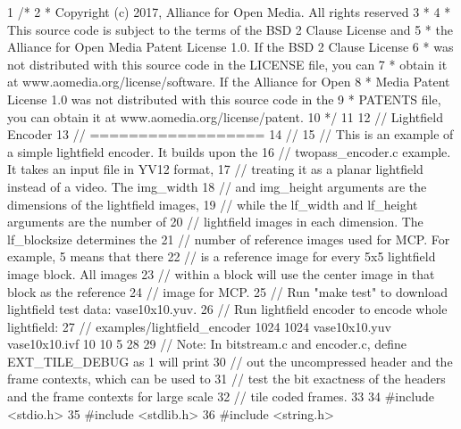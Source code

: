 \begin{DoxyCodeInclude}
1 \textcolor{comment}{/*}
2 \textcolor{comment}{ * Copyright (c) 2017, Alliance for Open Media. All rights reserved}
3 \textcolor{comment}{ *}
4 \textcolor{comment}{ * This source code is subject to the terms of the BSD 2 Clause License and}
5 \textcolor{comment}{ * the Alliance for Open Media Patent License 1.0. If the BSD 2 Clause License}
6 \textcolor{comment}{ * was not distributed with this source code in the LICENSE file, you can}
7 \textcolor{comment}{ * obtain it at www.aomedia.org/license/software. If the Alliance for Open}
8 \textcolor{comment}{ * Media Patent License 1.0 was not distributed with this source code in the}
9 \textcolor{comment}{ * PATENTS file, you can obtain it at www.aomedia.org/license/patent.}
10 \textcolor{comment}{ */}
11 
12 \textcolor{comment}{// Lightfield Encoder}
13 \textcolor{comment}{// ==================}
14 \textcolor{comment}{//}
15 \textcolor{comment}{// This is an example of a simple lightfield encoder.  It builds upon the}
16 \textcolor{comment}{// twopass\_encoder.c example. It takes an input file in YV12 format,}
17 \textcolor{comment}{// treating it as a planar lightfield instead of a video. The img\_width}
18 \textcolor{comment}{// and img\_height arguments are the dimensions of the lightfield images,}
19 \textcolor{comment}{// while the lf\_width and lf\_height arguments are the number of}
20 \textcolor{comment}{// lightfield images in each dimension. The lf\_blocksize determines the}
21 \textcolor{comment}{// number of reference images used for MCP. For example, 5 means that there}
22 \textcolor{comment}{// is a reference image for every 5x5 lightfield image block. All images}
23 \textcolor{comment}{// within a block will use the center image in that block as the reference}
24 \textcolor{comment}{// image for MCP.}
25 \textcolor{comment}{// Run "make test" to download lightfield test data: vase10x10.yuv.}
26 \textcolor{comment}{// Run lightfield encoder to encode whole lightfield:}
27 \textcolor{comment}{// examples/lightfield\_encoder 1024 1024 vase10x10.yuv vase10x10.ivf 10 10 5}
28 
29 \textcolor{comment}{// Note: In bitstream.c and encoder.c, define EXT\_TILE\_DEBUG as 1 will print}
30 \textcolor{comment}{// out the uncompressed header and the frame contexts, which can be used to}
31 \textcolor{comment}{// test the bit exactness of the headers and the frame contexts for large scale}
32 \textcolor{comment}{// tile coded frames.}
33 
34 \textcolor{preprocessor}{#include <stdio.h>}
35 \textcolor{preprocessor}{#include <stdlib.h>}
36 \textcolor{preprocessor}{#include <string.h>}

\end{DoxyCodeInclude}
